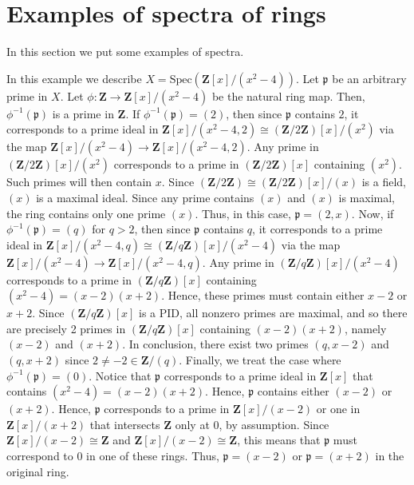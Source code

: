 \section{Examples of spectra of rings}
\label{section-examples-spectra}

\noindent
In this section we put some examples of spectra.

\begin{example}
\label{example-spec-Zxmodx2minus4}
In this example we describe $X = \text{Spec} (\mathbf{Z}[x]/(x^2 - 4))$.
Let $\mathfrak{p}$ be an arbitrary prime in $X$.
Let $\phi: \mathbf{Z} \to \mathbf{Z}[x]/(x^2 - 4)$ be the natural ring map.
Then, $ \phi^{-1}(\mathfrak p)$ is a prime in $\mathbf{Z}$.
If $ \phi^{-1}(\mathfrak p) = (2)$, then since $\mathfrak p$ contains $2$,
it corresponds to a prime ideal in
$\mathbf{Z}[x]/(x^2 - 4, 2) \cong (\mathbf{Z}/2\mathbf{Z})[x]/(x^2)$
via the map $ \mathbf{Z}[x]/(x^2 - 4) \to  \mathbf{Z}[x]/(x^2 - 4, 2)$.
Any prime in $(\mathbf{Z}/2\mathbf{Z})[x]/(x^2)$ corresponds to a prime
in $(\mathbf{Z}/2\mathbf{Z})[x]$ containing $(x^2)$.  Such primes will
then contain $x$.  Since
$(\mathbf{Z}/2\mathbf{Z}) \cong (\mathbf{Z}/2\mathbf{Z})[x]/(x)$ is a field,
$(x)$ is a maximal ideal.  Since any prime contains $(x)$ and $(x)$ is
maximal, the ring contains only one prime $(x)$.  Thus, in this case,
$\mathfrak p = (2, x)$.  Now, if $ \phi^{-1}(\mathfrak p) = (q)$ for
$q > 2$, then since $\mathfrak p$ contains $q$, it corresponds to a
prime ideal in
$\mathbf{Z}[x]/(x^2 - 4, q) \cong (\mathbf{Z}/q\mathbf{Z})[x]/(x^2 - 4)$
via the map $ \mathbf{Z}[x]/(x^2 - 4) \to  \mathbf{Z}[x]/(x^2 - 4, q)$.
Any prime in $(\mathbf{Z}/q\mathbf{Z})[x]/(x^2 - 4)$ corresponds to a
prime in $(\mathbf{Z}/q\mathbf{Z})[x]$ containing $(x^2 - 4) = (x -2)(x + 2)$.
Hence, these primes must contain either $x -2$ or $x + 2$.  Since
$(\mathbf{Z}/q\mathbf{Z})[x]$ is a PID, all nonzero
primes are maximal, and so there
are precisely 2 primes in $(\mathbf{Z}/q\mathbf{Z})[x]$ containing
$(x-2)(x + 2)$, namely $(x-2)$ and $(x + 2)$.  In conclusion, there exist two
primes $(q, x-2)$ and $(q, x + 2)$ since $2 \neq -2 \in \mathbf{Z}/(q)$.
Finally, we treat the case where $\phi^{-1}(\mathfrak p) = (0)$.  Notice
that $\mathfrak p$ corresponds to a prime ideal in $\mathbf{Z}[x]$ that
contains $(x^2 - 4) = (x -2)(x + 2)$.  Hence, $\mathfrak p$ contains either
$(x-2)$ or $(x + 2)$.  Hence, $\mathfrak p$ corresponds to a prime in
$\mathbf{Z}[x]/(x-2)$ or one in $\mathbf{Z}[x]/(x + 2)$ that intersects
$\mathbf{Z}$ only at $0$, by assumption.  Since
$\mathbf{Z}[x]/(x-2) \cong \mathbf{Z}$ and
$\mathbf{Z}[x]/(x-2) \cong \mathbf{Z}$, this means that $\mathfrak p$
must correspond to $0$ in one of these rings.  Thus,
$\mathfrak p = (x-2)$ or $\mathfrak p = (x + 2)$ in the original ring.
\end{example}

